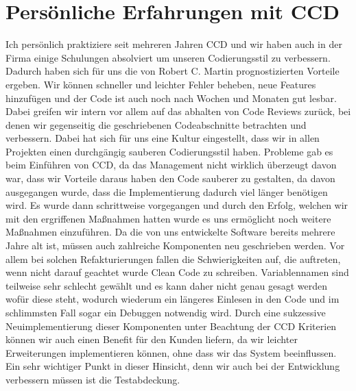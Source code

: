 \section{Persönliche Erfahrungen mit CCD}
Ich persönlich praktiziere seit mehreren Jahren CCD und wir haben auch in der Firma einige Schulungen absolviert um unseren Codierungsstil zu verbessern. Dadurch haben sich für uns die von Robert C. Martin prognostizierten Vorteile ergeben. Wir können schneller und leichter Fehler beheben, neue Features hinzufügen und der Code ist auch noch nach Wochen und Monaten gut lesbar. Dabei greifen wir intern vor allem auf das abhalten von Code Reviews zurück, bei denen wir gegenseitig die geschriebenen Codeabschnitte betrachten und verbessern. Dabei hat sich für uns eine Kultur eingestellt, dass wir in allen Projekten einen durchgängig sauberen Codierungsstil haben. Probleme gab es beim Einführen von CCD, da das Management nicht wirklich überzeugt davon war, dass wir Vorteile daraus haben den Code sauberer zu gestalten, da davon ausgegangen wurde, dass die Implementierung dadurch viel länger benötigen wird. Es wurde dann schrittweise vorgegangen und durch den Erfolg, welchen wir mit den ergriffenen Maßnahmen hatten wurde es uns ermöglicht noch weitere Maßnahmen einzuführen. Da die von uns entwickelte Software bereits mehrere Jahre alt ist, müssen auch zahlreiche Komponenten neu geschrieben werden. Vor allem bei solchen Refakturierungen fallen die Schwierigkeiten auf, die auftreten, wenn nicht darauf geachtet wurde Clean Code zu schreiben. Variablennamen sind teilweise sehr schlecht gewählt und es kann daher nicht genau gesagt werden wofür diese steht, wodurch wiederum ein längeres Einlesen in den Code und im schlimmsten Fall sogar ein Debuggen notwendig wird. Durch eine sukzessive Neuimplementierung dieser Komponenten unter Beachtung der CCD Kriterien können wir auch einen Benefit für den Kunden liefern, da wir leichter Erweiterungen implementieren können, ohne dass wir das System beeinflussen. Ein sehr wichtiger Punkt in dieser Hinsicht, denn wir auch bei der Entwicklung verbessern müssen ist die Testabdeckung. 


